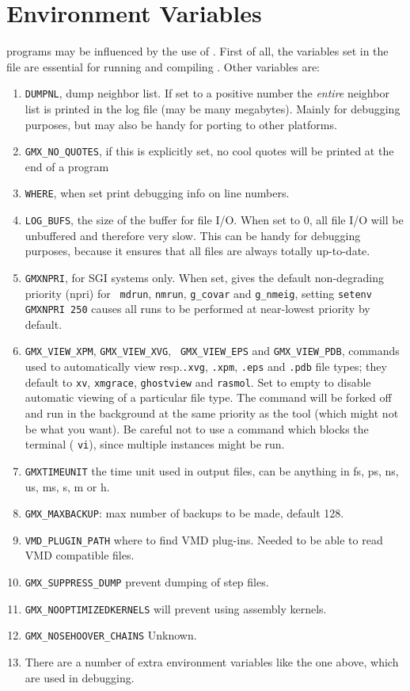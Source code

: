 \section{Environment Variables}
{\gromacs} programs may be influenced by the use of 
. 
First of all, the variables set in the  file
are essential for running and compiling {\gromacs}. Other variables are:
\begin{enumerate}
\item   {\tt DUMPNL}, dump neighbor list. 
        If set to a positive number the {\em entire}
        neighbor list is printed in the log file (may be many megabytes).
        Mainly for debugging purposes, but may also be handy for
        porting to other platforms.
\item   {\tt GMX_NO_QUOTES}, if this is explicitly set, no cool quotes
        will be printed at the end of a program
\item   {\tt WHERE}, when set print debugging info on line numbers.
\item   {\tt LOG_BUFS}, the size of the buffer for file I/O. When set
        to 0, all file I/O will be unbuffered and therefore very slow.
        This can be handy for debugging purposes, because it ensures
        that all files are always totally up-to-date.
\item   {\tt GMXNPRI}, for SGI systems only. When set, gives the
        default non-degrading priority (npri) for {\tt
        mdrun}, {\tt nmrun}, {\tt g_covar} and {\tt g_nmeig},
        {\eg}\@ setting \verb'setenv GMXNPRI 250' causes all
        runs to be performed at near-lowest priority by default.
\item   {\tt GMX_VIEW_XPM}, {\tt GMX_VIEW_XVG}, {\tt
        GMX_VIEW_EPS} and {\tt GMX_VIEW_PDB}, commands used to
        automatically view resp.\@ {\tt .xvg}, {\tt .xpm}, {\tt .eps}
        and {\tt .pdb} file types; they default to {\tt xv}, {\tt xmgrace},
        {\tt ghostview} and {\tt rasmol}. Set to empty to disable
        automatic viewing of a particular file type. The command will
        be forked off and run in the background at the same priority
        as the {\gromacs} tool (which might not be what you want).
        Be careful not to use a command which blocks the terminal
        ({\eg} {\tt vi}), since multiple instances might be run.
\item   {\tt GMXTIMEUNIT} the time unit used in output files, can be
        anything in fs, ps, ns, us, ms, s, m or h.
\item {\tt GMX_MAXBACKUP}: max number of backups to be made, default
  128.
\item {\tt VMD_PLUGIN_PATH} where to find VMD plug-ins. Needed to be
  able to read VMD compatible files.
\item {\tt GMX_SUPPRESS_DUMP} prevent dumping of step files.
\item {\tt GMX_NOOPTIMIZEDKERNELS} will prevent using assembly
  kernels.
\item {\tt GMX_NOSEHOOVER_CHAINS} Unknown.
\item There are a number of extra environment variables like the one
  above, which are used in debugging.
\end{enumerate}

